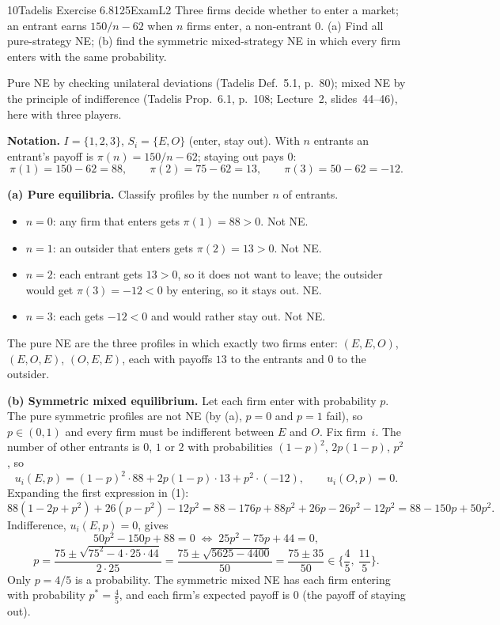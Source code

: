 \begin{exsol}{10}{Tadelis Exercise 6.8}{125}{Exam}{L2}
\asked Three firms decide whether to enter a market; an entrant earns $150/n - 62$ when $n$ firms
enter, a non-entrant $0$. (a) Find all pure-strategy NE; (b) find the symmetric mixed-strategy
NE in which every firm enters with the same probability.

\method Pure NE by checking unilateral deviations (Tadelis Def.~5.1, p.~80); mixed NE by the
principle of indifference (Tadelis Prop.~6.1, p.~108; Lecture~2, slides~44--46), here with three
players.

\solution
\textbf{Notation.} $I = \{1,2,3\}$, $S_i = \{E, O\}$ (enter, stay out). With $n$ entrants an
entrant's payoff is $\pi(n) = 150/n - 62$; staying out pays $0$:
\[
  \pi(1) = 150 - 62 = 88, \qquad \pi(2) = 75 - 62 = 13, \qquad \pi(3) = 50 - 62 = -12 .
\]

\textbf{(a) Pure equilibria.} Classify profiles by the number $n$ of entrants.
\begin{itemize}
  \item $n = 0$: any firm that enters gets $\pi(1) = 88 > 0$. Not NE.
  \item $n = 1$: an outsider that enters gets $\pi(2) = 13 > 0$. Not NE.
  \item $n = 2$: each entrant gets $13 > 0$, so it does not want to leave; the outsider would get
  $\pi(3) = -12 < 0$ by entering, so it stays out. NE.
  \item $n = 3$: each gets $-12 < 0$ and would rather stay out. Not NE.
\end{itemize}
The pure NE are the three profiles in which exactly two firms enter:
$(E,E,O)$, $(E,O,E)$, $(O,E,E)$, each with payoffs $13$ to the entrants and $0$ to the outsider.

\textbf{(b) Symmetric mixed equilibrium.} Let each firm enter with probability $p$. The pure
symmetric profiles are not NE (by (a), $p = 0$ and $p = 1$ fail), so $p \in (0,1)$ and every firm
must be indifferent between $E$ and $O$. Fix firm~$i$. The number of other entrants is $0$, $1$ or
$2$ with probabilities $(1-p)^2$, $2p(1-p)$, $p^2$, so
\[
  u_i(E, p) = (1-p)^2\cdot 88 + 2p(1-p)\cdot 13 + p^2\cdot(-12), \qquad u_i(O, p) = 0. \tag{1}
\]
Expanding the first expression in (1):
\[
  88(1 - 2p + p^2) + 26(p - p^2) - 12p^2 = 88 - 176p + 88p^2 + 26p - 26p^2 - 12p^2
  = 88 - 150p + 50p^2 .
\]
Indifference, $u_i(E,p) = 0$, gives
\[
  50p^2 - 150p + 88 = 0 \;\Longleftrightarrow\; 25p^2 - 75p + 44 = 0,
\]
\[
  p = \frac{75 \pm \sqrt{75^2 - 4\cdot 25\cdot 44}}{2\cdot 25}
    = \frac{75 \pm \sqrt{5625 - 4400}}{50} = \frac{75 \pm 35}{50} \in \Big\{\frac45,\ \frac{11}{5}\Big\}.
\]
Only $p = 4/5$ is a probability. The symmetric mixed NE has each firm entering with probability
$p^* = \tfrac45$, and each firm's expected payoff is $0$ (the payoff of staying out).


\end{exsol}

